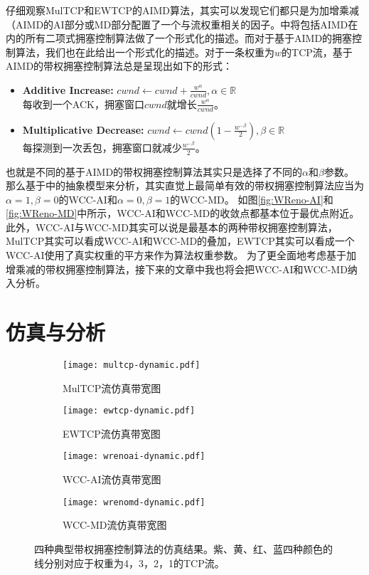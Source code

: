 \documentclass[winfonts]{njuthesis}
\begin{document}
仔细观察MulTCP和EWTCP的AIMD算法，其实可以发现它们都只是为加增乘减（AIMD的AI部分或MD部分配置了一个与流权重相关的因子。\cite{bansal2001binomial}中将包括AIMD在内的所有二项式拥塞控制算法做了一个形式化的描述。而对于基于AIMD的拥塞控制算法，我们也在此给出一个形式化的描述。对于一条权重为$w$的TCP流，基于AIMD的带权拥塞控制算法总是呈现出如下的形式：
\begin{itemize}
  \item {\bf Additive Increase:} $cwnd \leftarrow cwnd + \frac{w^\alpha}{cwnd}, \alpha \in \mathbb{R}$ \\
  每收到一个ACK，拥塞窗口$cwnd$就增长$\frac{w^\alpha}{cwnd}$。
  \item {\bf Multiplicative Decrease:} $cwnd \leftarrow cwnd (1 - \frac{w^{-\beta}}{2}), \beta \in \mathbb{R}$ \\
  每探测到一次丢包，拥塞窗口就减少$\frac{w^{-\beta}}{2}$。
\end{itemize}
也就是不同的基于AIMD的带权拥塞控制算法其实只是选择了不同的$\alpha$和$\beta$参数。
那么基于\cite{chiu1989analysis}中的抽象模型来分析，其实直觉上最简单有效的带权拥塞控制算法应当为$\alpha=1,\beta=0$的WCC-AI和$\alpha=0,\beta=1$的WCC-MD。
如图\ref{fig:WReno-AI}和\ref{fig:WReno-MD}中所示，WCC-AI和WCC-MD的收敛点都基本位于最优点附近。
此外，WCC-AI与WCC-MD其实可以说是最基本的两种带权拥塞控制算法，MulTCP其实可以看成WCC-AI和WCC-MD的叠加，EWTCP其实可以看成一个WCC-AI使用了真实权重的平方来作为算法权重参数。
为了更全面地考虑基于加增乘减的带权拥塞控制算法，接下来的文章中我也将会把WCC-AI和WCC-MD纳入分析。

\chapter{仿真与分析}\label{chapter:analysis}

\begin{figure*}[ht]
	\centering
  \begin{subfigure}{.6\textwidth}
    \centering
		\texttt{[image: multcp-dynamic.pdf]}
    \label{fig:MulTCPPerformance}
    \caption{MulTCP流仿真带宽图}
  \end{subfigure}
  \begin{subfigure}{.6\textwidth}
    \centering
		\texttt{[image: ewtcp-dynamic.pdf]}
    \label{fig:EWTCPPerformance}
    \caption{EWTCP流仿真带宽图}
	\end{subfigure}
  \begin{subfigure}{.6\textwidth}
    \centering
		\texttt{[image: wrenoai-dynamic.pdf]}
    \label{fig:WReno-AIPerformance}
    \caption{WCC-AI流仿真带宽图}
  \end{subfigure}
  \begin{subfigure}{.6\textwidth}
    \centering
		\texttt{[image: wrenomd-dynamic.pdf]}
    \label{fig:WReno-AIPerformance}
    \caption{WCC-MD流仿真带宽图}
	\end{subfigure}
	\caption{四种典型带权拥塞控制算法的仿真结果。紫、黄、红、蓝四种颜色的线分别对应于权重为4，3，2，1的TCP流。}
	\label{fig:Performance}
\end{figure*}
\end{document}
